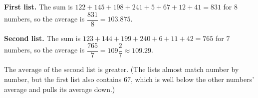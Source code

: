 \textbf{First list.} The sum is $122+145+198+241+5+67+12+41=831$ for $8$ numbers, so the average is $\dfrac{831}{8}=103.875$.

\textbf{Second list.} The sum is $123+144+199+240+6+11+42=765$ for $7$ numbers, so the average is $\dfrac{765}{7}=109\dfrac{2}{7}\approx109.29$.

The $\boxed{\text{average of the second list}}$ is greater. (The lists almost match number by number, but the first list also contains $67$, which is well below the other numbers' average and pulls its average down.)
